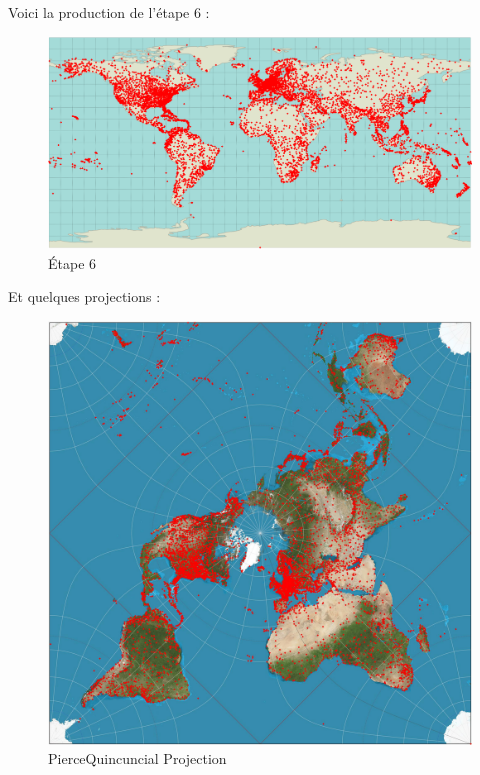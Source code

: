 \documentclass{article}
\begin{document}
	Voici la production de l'étape 6 :
	
	\begin{figure}[H]
		\centering
		\includegraphics[scale=0.3]{etape6}
		\caption{Étape 6}
		\label{fig:etape6}
	\end{figure}
	
	Et quelques projections : 
	
	\begin{figure}[H]
		\centering
		\includegraphics[scale=0.2]{peirceQuincuncial_result.jpg}
		\caption{PierceQuincuncial Projection}
		\label{fig:etape7pq}
	\end{figure}
	
\end{document}

